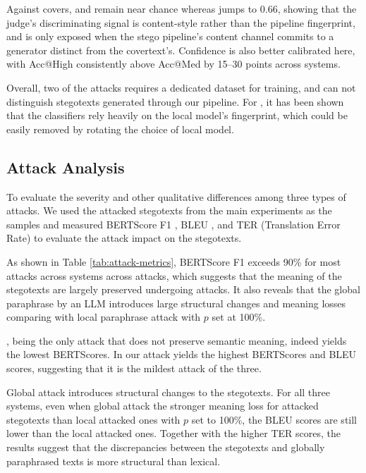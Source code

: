  Against \typetwo covers, \qa and \lr remain near chance whereas \sg jumps to 0.66, showing that the judge's discriminating signal is content-style rather than the pipeline fingerprint, and is only exposed when the stego pipeline's content channel commits to a generator distinct from the covertext's. Confidence is also better calibrated here, with Acc@High consistently above Acc@Med by 15--30 points across systems. 

Overall, two of the attacks requires a dedicated dataset for training, and can not distinguish stegotexts generated through our pipeline. For \sg, it has been shown that the classifiers rely heavily on the local model's fingerprint, which could be easily removed by rotating the choice of local model.

\subsection{Attack Analysis}
\label{app:subsec:attack-analysis}
To evaluate the severity and other qualitative differences among three types of attacks. We used the attacked stegotexts from the main experiments as the samples and measured BERTScore F1 \cite{zhang2020bertscore}, BLEU \cite {papineni-etal-2002-bleu}, and TER (Translation Error Rate) to evaluate the attack impact on the stegotexts.

As shown in Table \ref{tab:attack-metrics}, BERTScore F1 exceeds 90\% for most attacks across systems across attacks, which suggests that the meaning of the stegotexts are largely preserved undergoing attacks. It also reveals that the global paraphrase by an LLM introduces large structural changes and meaning losses comparing with local paraphrase attack with $p$ set at 100\%. 

\syn, being the only attack that does not preserve semantic meaning, indeed yields the lowest BERTScores. In our  \rtt attack yields the highest BERTScores and BLEU scores, suggesting that it is the mildest attack of the three.

Global \llmp attack introduces structural changes to the stegotexts. For all three systems, even when global \llmp attack the stronger meaning loss for attacked stegotexts than local \llmp attacked ones with $p$ set to 100\%, the BLEU scores are still lower than the local \llmp attacked ones. Together with the higher TER scores, the results suggest that the discrepancies between the stegotexts and globally paraphrased texts is more structural than lexical.

